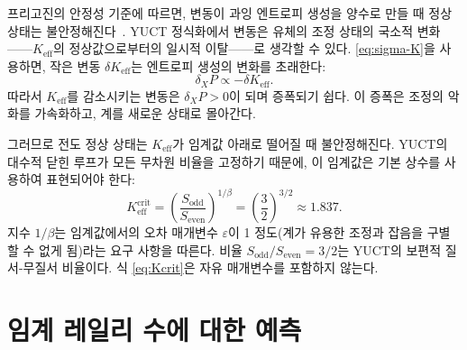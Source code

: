\documentclass[12pt,a4paper]{article}
\begin{document}
	프리고진의 안정성 기준에 따르면, 변동이 과잉 엔트로피 생성을 양수로 만들 때 정상 상태는 불안정해진다~\cite{Glansdorff1971}. YUCT 정식화에서 변동은 유체의 조정 상태의 국소적 변화——\(K_{\mathrm{eff}}\)의 정상값으로부터의 일시적 이탈——로 생각할 수 있다. \eqref{eq:sigma-K}을 사용하면, 작은 변동 \(\delta K_{\mathrm{eff}}\)는 엔트로피 생성의 변화를 초래한다:
	\begin{equation}
		\delta_X P \propto - \delta K_{\mathrm{eff}}.
	\end{equation}
	따라서 \(K_{\mathrm{eff}}\)를 감소시키는 변동은 \(\delta_X P > 0\)이 되며 증폭되기 쉽다. 이 증폭은 조정의 악화를 가속화하고, 계를 새로운 상태로 몰아간다.
	
	그러므로 전도 정상 상태는 \(K_{\mathrm{eff}}\)가 임계값 아래로 떨어질 때 불안정해진다. YUCT의 대수적 닫힌 루프가 모든 무차원 비율을 고정하기 때문에, 이 임계값은 기본 상수를 사용하여 표현되어야 한다:
	\begin{equation}\label{eq:Kcrit}
		K_{\mathrm{eff}}^{\mathrm{crit}} = \left( \frac{S_{\mathrm{odd}}}{S_{\mathrm{even}}} \right)^{1/\beta}
		= \left( \frac{3}{2} \right)^{3/2} \approx 1.837.
	\end{equation}
	지수 \(1/\beta\)는 임계값에서의 오차 매개변수 \(\varepsilon\)이 1 정도(계가 유용한 조정과 잡음을 구별할 수 없게 됨)라는 요구 사항을 따른다. 비율 \(S_{\mathrm{odd}}/S_{\mathrm{even}} = 3/2\)는 YUCT의 보편적 질서-무질서 비율이다. 식 \eqref{eq:Kcrit}은 자유 매개변수를 포함하지 않는다.
	
	\section{임계 레일리 수에 대한 예측}
	
\end{document}
